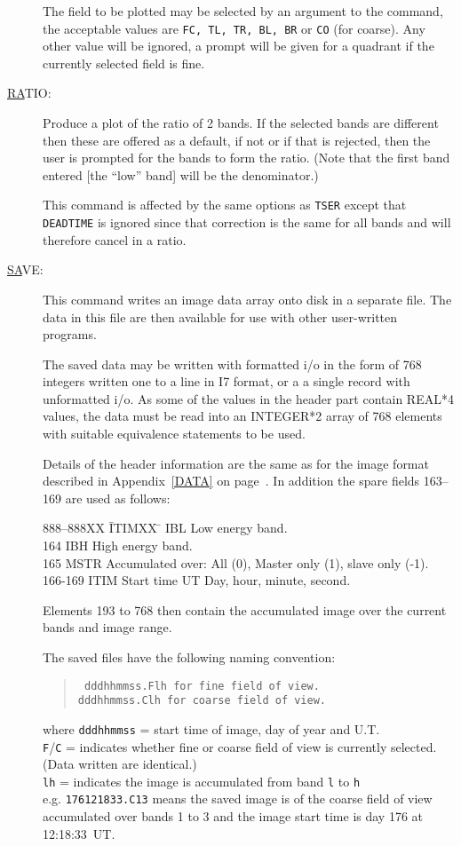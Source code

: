\begin{description}
The field to be plotted may be selected by an argument to the command,
the acceptable values are {\tt FC, TL, TR, BL, BR} or {\tt CO} (for
coarse).  Any other value will be ignored, a prompt will be given for a
quadrant if the currently selected field is fine.

\item[\underline{RA}TIO: ] \label{ra}
Produce a plot of the ratio of 2 bands. If the selected bands are
different then these are offered as a default, if not or if that is
rejected, then the user is prompted for the bands to form the ratio.
(Note that the first band entered [the ``low'' band] will be the
denominator.)

This command is affected by the same options as {\tt TSER} except that
{\tt DEADTIME} is ignored since that correction is the same for all
bands and will therefore cancel in a ratio.

\item[\underline{SA}VE: ] \label{sa}
This command writes an image data array onto disk in a separate file.
The data in this file are then available for use with other
user-written programs.

The saved data may be written with formatted i/o in the form of 768
integers written one to a line in I7 format, or a a single record with
unformatted i/o.  As some of the values in the header part contain
REAL*4 values, the data must be read into an INTEGER*2 array of 768
elements with suitable equivalence statements to be used.

Details of the header information are the same as for the image format
described in Appendix~\ref{DATA} on page~\pageref{DATA}.  In addition
the spare fields 163--169 are used as follows:
\begin{tabbing}
888--888XX \= ITIMXX \=  \> IBL \> Low energy band. \\ 164 \>
IBH \> High energy band. \\ 165 \> MSTR \> Accumulated over: All (0),
Master only (1), slave only (-1).\\ 166-169 \> ITIM \> Start time UT
Day, hour, minute, second.
\end{tabbing}
Elements 193 to 768 then contain the accumulated image over the current
bands and image range.

The saved files have the following naming convention:
\begin{quote}\tt
dddhhmmss.Flh {\rm for fine field of view.}\\ dddhhmmss.Clh {\rm for
coarse field of view.}
\end{quote}
where {\tt dddhhmmss} = start time of image, day of year and U.T.\\
{\tt F}/{\tt C} = indicates whether fine or coarse field of view is
currently selected. (Data written are identical.)\\ {\tt lh} =
indicates the image is accumulated from band {\tt l} to {\tt h}\\ e.g.
{\tt 176121833.C13} means the saved image is of the coarse field of
view accumulated over bands 1 to 3 and the image start time is day 176
at 12:18:33~UT.


\end{description}
